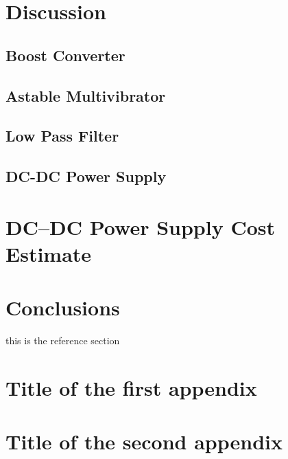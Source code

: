 \documentclass[11pt]{article}
\begin{document}
\section{Discussion}
\subsection{Boost Converter}
\subsection{Astable Multivibrator}
\subsection{Low Pass Filter}
\subsection{DC-DC Power Supply}


\section{DC--DC Power Supply Cost Estimate}


\section{Conclusions}

this is the reference section
\cite{ECE214_Lab7}
\cite{test}


\newpage
\begin{appendices}
\section{Title of the first appendix}

\section{Title of the second appendix}
\end{appendices}


\newpage
\end{document}

